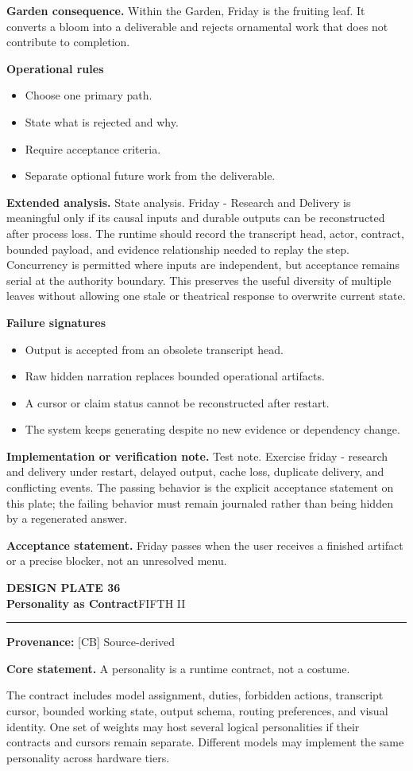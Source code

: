\documentclass[10pt,letterpaper,oneside]{article}
\newcommand{\prov}[1]{\textcolor{gardenBlue}{\sffamily\footnotesize\textbf{Provenance:} #1}}
\newcommand{\platetitle}[3]{%
  \begin{minipage}[t][0.54in][t]{\textwidth}
  {\sffamily\bfseries\color{gardenDeep}\fontsize{9}{10}\selectfont DESIGN PLATE #1}\\[-1pt]
  {\sffamily\bfseries\color{gardenInk}\fontsize{16.5}{18}\selectfont #2}\hfill{\sffamily\color{gardenGreen}\large #3}
  \end{minipage}\vspace{-2pt}\hrule\vspace{5pt}}
\begin{document}
\textbf{Garden consequence.} Within the Garden, Friday is the fruiting leaf. It converts a bloom into a deliverable and rejects ornamental work that does not contribute to completion.

\textbf{Operational rules}
\begin{itemize}
\item Choose one primary path.
\item State what is rejected and why.
\item Require acceptance criteria.
\item Separate optional future work from the deliverable.
\end{itemize}
\textbf{Extended analysis.} State analysis. Friday - Research and Delivery is meaningful only if its causal inputs and durable outputs can be reconstructed after process loss. The runtime should record the transcript head, actor, contract, bounded payload, and evidence relationship needed to replay the step. Concurrency is permitted where inputs are independent, but acceptance remains serial at the authority boundary. This preserves the useful diversity of multiple leaves without allowing one stale or theatrical response to overwrite current state.

\textbf{Failure signatures}
\begin{itemize}
\item Output is accepted from an obsolete transcript head.
\item Raw hidden narration replaces bounded operational artifacts.
\item A cursor or claim status cannot be reconstructed after restart.
\item The system keeps generating despite no new evidence or dependency change.
\end{itemize}
\textbf{Implementation or verification note.} Test note. Exercise friday - research and delivery under restart, delayed output, cache loss, duplicate delivery, and conflicting events. The passing behavior is the explicit acceptance statement on this plate; the failing behavior must remain journaled rather than being hidden by a regenerated answer.

\begin{acceptbox}
\textbf{Acceptance statement.} Friday passes when the user receives a finished artifact or a precise blocker, not an unresolved menu.
\end{acceptbox}
\newpage
\platetitle{36}{Personality as Contract}{FIFTH II}
\prov{[CB] Source-derived}
\fontsize{8.85}{10.45}\selectfont
\begin{corebox}
\textbf{Core statement.} A personality is a runtime contract, not a costume.
\end{corebox}
The contract includes model assignment, duties, forbidden actions, transcript cursor, bounded working state, output schema, routing preferences, and visual identity. One set of weights may host several logical personalities if their contracts and cursors remain separate. Different models may implement the same personality across hardware tiers.
\end{document}

